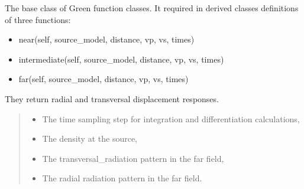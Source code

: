 \documentclass[letterpaper,10pt,english]{sphinxmanual}
\begin{document}
\begin{fulllineitems}
\label{\detokenize{api_lib:green_functions.BaseGreenFunction}}
\pysigstartsignatures
{}
\pysigstopsignatures
\sphinxAtStartPar
The base class of Green function classes. It required in derived classes definitions of three functions:
\begin{itemize}
\item {} 
\sphinxAtStartPar
near(self, source\_model, distance, vp, vs, times)

\item {} 
\sphinxAtStartPar
intermediate(self, source\_model, distance, vp, vs, times)

\item {} 
\sphinxAtStartPar
far(self, source\_model, distance, vp, vs, times)

\end{itemize}

\sphinxAtStartPar
They return radial and transversal displacement responses.
\begin{quote}\begin{description}
\begin{itemize}
\item {} 
\sphinxAtStartPar
{} \textendash{} The time sampling step for integration and differentiation calculations,

\item {} 
\sphinxAtStartPar
{} \textendash{} The density at the source,

\item {} 
\sphinxAtStartPar
{} \textendash{} The transversal\_radiation pattern in the far field,

\item {} 
\sphinxAtStartPar
{} \textendash{} The radial radiation pattern in the far field.

\end{itemize}


\end{description}
\end{quote}
\end{fulllineitems}
\end{document}
